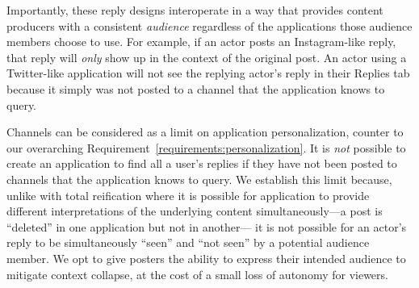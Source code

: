 Importantly, these reply designs interoperate in a way that provides content producers with
a consistent \emph{audience} regardless of the applications those audience members choose to use.
For example, if an actor posts an Instagram-like reply, that reply will \emph{only} show up
in the context of the original post. An actor using a Twitter-like application
will not see the replying actor's reply in their Replies tab because it simply was not
posted to a channel that the application knows to query.

Channels can be considered as a limit on application personalization,
counter to our overarching Requirement~\ref{requirements:personalization}.
It is \emph{not} possible to create an
application to find all a user's replies if they have not been posted to channels that
the application knows to query.
We establish this limit because, unlike with total reification where it is
possible for application to provide different interpretations of the underlying
content simultaneously---a post is ``deleted'' in one application but not in another---%
it is not possible for an actor's reply to be simultaneously ``seen'' and ``not seen''
by a potential audience member.
We opt to give posters the ability to express their intended audience
to mitigate context collapse, at the cost of a small loss of autonomy for viewers.








